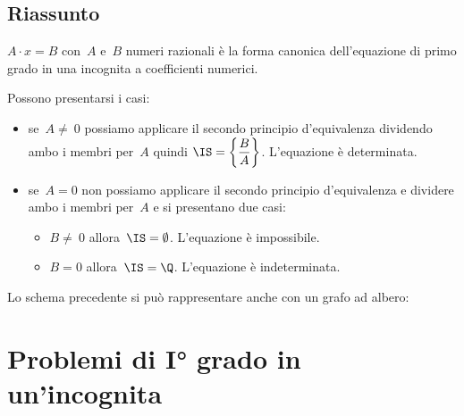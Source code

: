 
\subsection{Riassunto}
\(A\cdot x=B\) con~\(A\) e~\(B\) numeri
razionali è la forma canonica dell'equazione di primo grado in una
incognita a coefficienti numerici.%

Possono presentarsi i casi:
\begin{itemize} [nosep]
 \item se~\(A\neq~0\) possiamo applicare il secondo principio
d'equivalenza dividendo ambo i membri per~\(A\) quindi
\(\IS =\left\{\dfrac{B}{A}\right\}\). L'equazione è determinata.
 \item se~\(A=0\) non possiamo applicare il secondo principio
d'equivalenza e dividere ambo i membri per~\(A\) e si
presentano due casi:
\begin{itemize} [nosep]
\item \(B\neq~0\) allora~\(\IS =\emptyset \). L'equazione è impossibile.
 \item \(B=0\) allora~\(\IS =\Q\). L'equazione è indeterminata.
\end{itemize}
\end{itemize}

Lo schema precedente si può rappresentare anche con un grafo ad
albero:
\begin{center}
%  
\alberoequazioni
\end{center}





\section{Problemi di I° grado in un'incognita}
\label{sec:equazioni_problemi}

